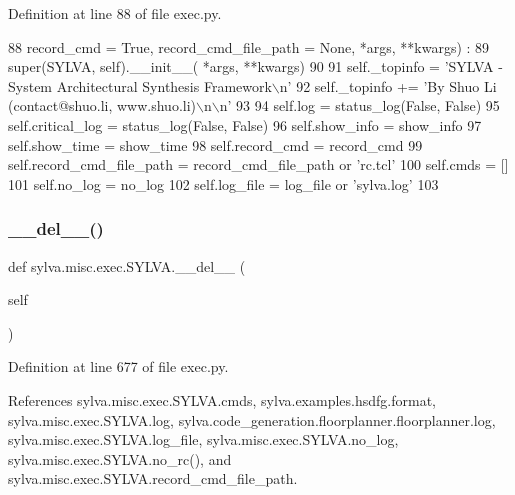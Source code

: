 Definition at line 88 of file exec.\+py.


\begin{DoxyCode}
88     record\_cmd = \textcolor{keyword}{True}, record\_cmd\_file\_path = \textcolor{keywordtype}{None}, *args, **kwargs) :
89     super(SYLVA, self).\_\_init\_\_( *args, **kwargs)
90 
91     self.\_topinfo = \textcolor{stringliteral}{'SYLVA - System Architectural Synthesis Framework\(\backslash\)n'}
92     self.\_topinfo += \textcolor{stringliteral}{'By Shuo Li (contact@shuo.li, www.shuo.li)\(\backslash\)n\(\backslash\)n'}
93 
94     self.log = status\_log(\textcolor{keyword}{False}, \textcolor{keyword}{False})
95     self.critical\_log = status\_log(\textcolor{keyword}{False}, \textcolor{keyword}{False})
96     self.show\_info = show\_info
97     self.show\_time = show\_time
98     self.record\_cmd = record\_cmd
99     self.record\_cmd\_file\_path = record\_cmd\_file\_path \textcolor{keywordflow}{or} \textcolor{stringliteral}{'rc.tcl'}
100     self.cmds = []
101     self.no\_log = no\_log
102     self.log\_file = log\_file \textcolor{keywordflow}{or} \textcolor{stringliteral}{'sylva.log'}
103 
\end{DoxyCode}
\mbox{\label{classsylva_1_1misc_1_1exec_1_1_s_y_l_v_a_af65fde8b73d4a20bb2fba9d6d31d5e51}} 
\subsubsection{\texorpdfstring{\+\_\+\+\_\+del\+\_\+\+\_\+()}{\_\_del\_\_()}}
{\footnotesize\ttfamily def sylva.\+misc.\+exec.\+S\+Y\+L\+V\+A.\+\_\+\+\_\+del\+\_\+\+\_\+ (\begin{DoxyParamCaption}\item[{}]{self }\end{DoxyParamCaption})}



Definition at line 677 of file exec.\+py.



References sylva.\+misc.\+exec.\+S\+Y\+L\+V\+A.\+cmds, sylva.\+examples.\+hsdfg.\+format, sylva.\+misc.\+exec.\+S\+Y\+L\+V\+A.\+log, sylva.\+code\+\_\+generation.\+floorplanner.\+floorplanner.\+log, sylva.\+misc.\+exec.\+S\+Y\+L\+V\+A.\+log\+\_\+file, sylva.\+misc.\+exec.\+S\+Y\+L\+V\+A.\+no\+\_\+log, sylva.\+misc.\+exec.\+S\+Y\+L\+V\+A.\+no\+\_\+rc(), and sylva.\+misc.\+exec.\+S\+Y\+L\+V\+A.\+record\+\_\+cmd\+\_\+file\+\_\+path.


